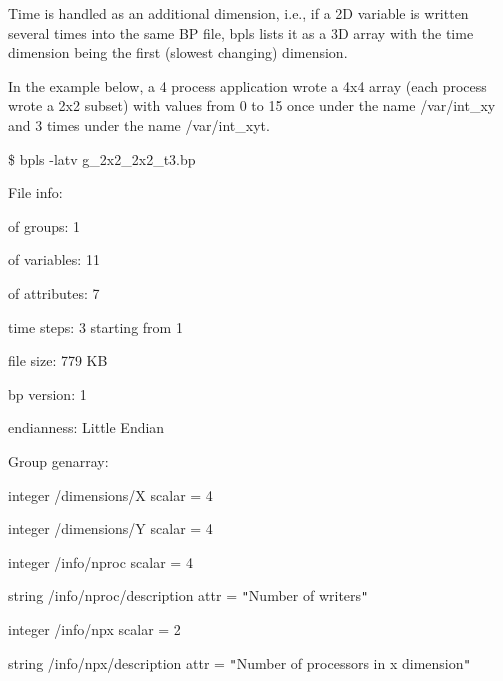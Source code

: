 \vspace{22pt}
\leftskip=0pt
\parindent=0pt
Time is handled as an additional dimension, i.e., if a 2D variable is written several 
times into the same BP file, bpls lists it as a 3D array with the time dimension 
being the first (slowest changing) dimension. 

\vspace{10pt}
In the example below, a 4 process application wrote a 4x4 array (each process wrote 
a 2x2 subset) with values from 0 to 15 once under the name /var/int\_xy and 3 times 
under the name /var/int\_xyt. 

\vspace{10pt}
\$ bpls -latv g\_2x2\_2x2\_t3.bp

\vspace{10pt}
File info:

\vspace{10pt}
\parindent=7pt
of groups:     1

\vspace{10pt}
of variables:  11

\vspace{10pt}
of attributes: 7

\vspace{10pt}
time steps:    3 starting from 1

\vspace{10pt}
file size:     779 KB

\vspace{10pt}
bp version:    1

\vspace{10pt}
endianness:    Little Endian

\vspace{22pt}
\parindent=0pt
Group genarray:

\vspace{10pt}
\parindent=7pt
integer    /dimensions/X             scalar = 4 

\vspace{10pt}
integer    /dimensions/Y             scalar = 4 

\vspace{10pt}
integer    /info/nproc               scalar = 4 

\vspace{10pt}
string     /info/nproc/description   attr   = \texttt{"}Number of writers\texttt{"}

\vspace{10pt}
integer    /info/npx                 scalar = 2 

\vspace{10pt}
string     /info/npx/description     attr   = \texttt{"}Number of processors in 
x dimension\texttt{"}

